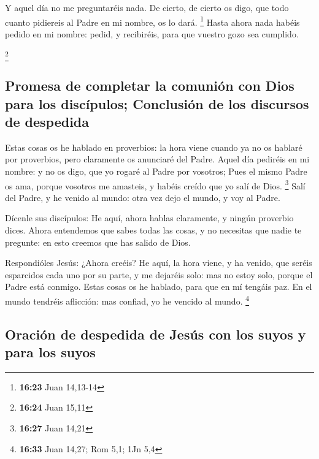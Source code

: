  Y aquel día no me preguntaréis nada. De cierto, de cierto
os digo, que todo cuanto pidiereis al Padre en mi nombre, os lo dará.
\footnote{\textbf{16:23} Juan 14,13-14}  Hasta ahora nada
habéis pedido en mi nombre: pedid, y recibiréis, para que vuestro gozo
sea cumplido.

\footnote{\textbf{16:24} Juan 15,11}

\hypertarget{promesa-de-completar-la-comuniuxf3n-con-dios-para-los-discuxedpulos-conclusiuxf3n-de-los-discursos-de-despedida}{%
\subsection{Promesa de completar la comunión con Dios para los
discípulos; Conclusión de los discursos de
despedida}\label{promesa-de-completar-la-comuniuxf3n-con-dios-para-los-discuxedpulos-conclusiuxf3n-de-los-discursos-de-despedida}}

 Estas cosas os he hablado en proverbios: la hora viene
cuando ya no os hablaré por proverbios, pero claramente os anunciaré del
Padre.  Aquel día pediréis en mi nombre: y no os digo, que
yo rogaré al Padre por vosotros;  Pues el mismo Padre os
ama, porque vosotros me amasteis, y habéis creído que yo salí de Dios.
\footnote{\textbf{16:27} Juan 14,21}  Salí del Padre, y he
venido al mundo: otra vez dejo el mundo, y voy al Padre.

 Dícenle sus discípulos: He aquí, ahora hablas claramente,
y ningún proverbio dices.  Ahora entendemos que sabes todas
las cosas, y no necesitas que nadie te pregunte: en esto creemos que has
salido de Dios.

 Respondióles Jesús: ¿Ahora creéis?  He aquí,
la hora viene, y ha venido, que seréis esparcidos cada uno por su parte,
y me dejaréis solo: mas no estoy solo, porque el Padre está conmigo.
 Estas cosas os he hablado, para que en mí tengáis paz. En
el mundo tendréis aflicción: mas confiad, yo he vencido al mundo.
\footnote{\textbf{16:33} Juan 14,27; Rom 5,1; 1Jn 5,4}

\hypertarget{oraciuxf3n-de-despedida-de-jesuxfas-con-los-suyos-y-para-los-suyos}{%
\subsection{Oración de despedida de Jesús con los suyos y para los
suyos}\label{oraciuxf3n-de-despedida-de-jesuxfas-con-los-suyos-y-para-los-suyos}}

